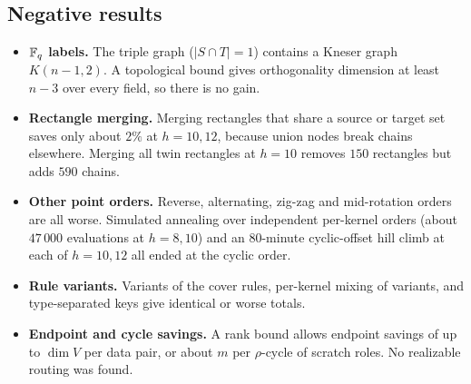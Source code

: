 \subsection{Negative results}
\begin{itemize}[leftmargin=*]
\item \textbf{$\mathbb{F}_q$ labels.} The triple graph ($|S\cap T| = 1$) contains a Kneser graph $K(n-1,2)$. A topological bound \cite{Haviv} gives orthogonality dimension at least $n-3$ over every field, so there is no gain.
\item \textbf{Rectangle merging.} Merging rectangles that share a source or target set saves only about $2\%$ at $h = 10, 12$, because union nodes break chains elsewhere. Merging all twin rectangles at $h = 10$ removes $150$ rectangles but adds $590$ chains.
\item \textbf{Other point orders.} Reverse, alternating, zig-zag and mid-rotation orders are all worse. Simulated annealing over independent per-kernel orders (about $47\,000$ evaluations at $h = 8, 10$) and an 80-minute cyclic-offset hill climb at each of $h = 10, 12$ all ended at the cyclic order.
\item \textbf{Rule variants.} Variants of the cover rules, per-kernel mixing of variants, and type-separated keys give identical or worse totals.
\item \textbf{Endpoint and cycle savings.} A rank bound allows endpoint savings of up to $\dim V$ per data pair, or about $m$ per $\rho$-cycle of scratch roles. No realizable routing was found.
\end{itemize}

